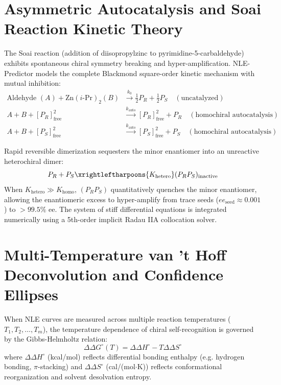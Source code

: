 \documentclass[11pt,a4paper]{article}
\begin{document}
\section{Asymmetric Autocatalysis and Soai Reaction Kinetic Theory}

The Soai reaction (addition of diisopropylzinc to pyrimidine-5-carbaldehyde) exhibits spontaneous chiral symmetry breaking and hyper-amplification. NLE-Predictor models the complete Blackmond square-order kinetic mechanism with mutual inhibition:
\begin{align}
\text{Aldehyde } (A) + \text{Zn}(i\text{-Pr})_2 (B) &\xrightarrow{k_0} \frac{1}{2} P_R + \frac{1}{2} P_S \quad (\text{uncatalyzed}) \\
A + B + [P_R]_{\text{free}}^2 &\xrightarrow{k_{\text{auto}}} [P_R]_{\text{free}}^2 + P_R \quad (\text{homochiral autocatalysis}) \\
A + B + [P_S]_{\text{free}}^2 &\xrightarrow{k_{\text{auto}}} [P_S]_{\text{free}}^2 + P_S \quad (\text{homochiral autocatalysis})
\end{align}

Rapid reversible dimerization sequesters the minor enantiomer into an unreactive heterochiral dimer:
\begin{equation}
P_R + P_S \xrightleftharpoons{K_{\text{hetero}}} (P_R P_S)_{\text{inactive}}
\end{equation}
When $K_{\text{hetero}} \gg K_{\text{homo}}$, $(P_R P_S)$ quantitatively quenches the minor enantiomer, allowing the enantiomeric excess to hyper-amplify from trace seeds ($ee_{\text{seed}} \approx 0.001$) to $> 99.5\%$ ee. The system of stiff differential equations is integrated numerically using a 5th-order implicit Radau IIA collocation solver.

\section{Multi-Temperature van 't Hoff Deconvolution and Confidence Ellipses}

When NLE curves are measured across multiple reaction temperatures ($T_1, T_2, \dots, T_m$), the temperature dependence of chiral self-recognition is governed by the Gibbs-Helmholtz relation:
\begin{equation}
\Delta\Delta G^\circ(T) = \Delta\Delta H^\circ - T \Delta\Delta S^\circ
\end{equation}
where $\Delta\Delta H^\circ$ (kcal/mol) reflects differential bonding enthalpy (e.g. hydrogen bonding, $\pi$-stacking) and $\Delta\Delta S^\circ$ (cal/(mol$\cdot$K)) reflects conformational reorganization and solvent desolvation entropy.
\end{document}
